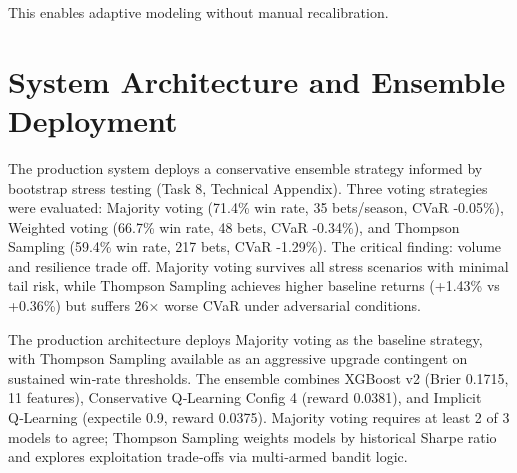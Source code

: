 This enables adaptive modeling without manual recalibration.


\section{System Architecture and Ensemble Deployment}
\label{sec:system_architecture}

The production system deploys a conservative ensemble strategy informed by bootstrap stress testing (Task 8, Technical Appendix). Three voting strategies were evaluated: Majority voting (71.4\% win rate, 35 bets/season, CVaR -0.05\%), Weighted voting (66.7\% win rate, 48 bets, CVaR -0.34\%), and Thompson Sampling (59.4\% win rate, 217 bets, CVaR -1.29\%). The critical finding: volume and resilience trade off. Majority voting survives all stress scenarios with minimal tail risk, while Thompson Sampling achieves higher baseline returns (+1.43\% vs +0.36\%) but suffers 26× worse CVaR under adversarial conditions.

The production architecture deploys Majority voting as the baseline strategy, with Thompson Sampling available as an aggressive upgrade contingent on sustained win‑rate thresholds. The ensemble combines XGBoost v2 (Brier 0.1715, 11 features), Conservative Q‑Learning Config 4 (reward 0.0381), and Implicit Q‑Learning (expectile 0.9, reward 0.0375). Majority voting requires at least 2 of 3 models to agree; Thompson Sampling weights models by historical Sharpe ratio and explores exploitation trade‑offs via multi‑armed bandit logic.

